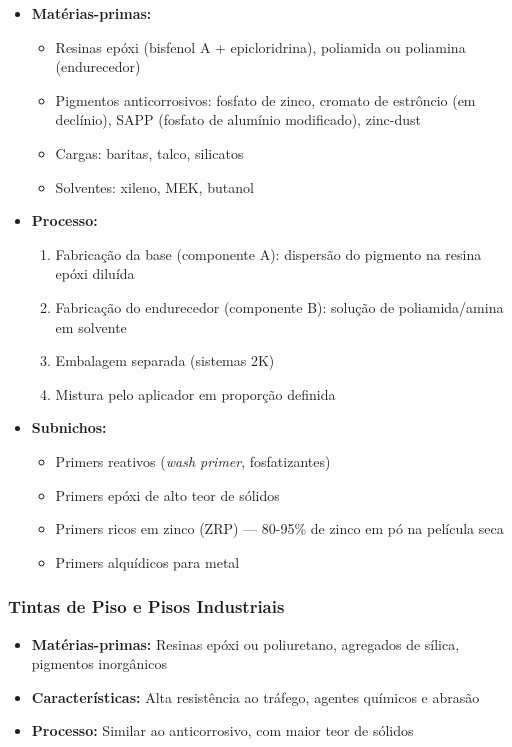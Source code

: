 \documentclass[
  12pt,
  a4paper,
  oneside,
  brazil,
  chapter=TITLE
]{article}
\begin{document}
\begin{itemize}
\tightlist
\item
  \textbf{Matérias-primas:}

  \begin{itemize}
  \tightlist
  \item
    Resinas epóxi (bisfenol A + epicloridrina), poliamida ou poliamina
    (endurecedor)
  \item
    Pigmentos anticorrosivos: fosfato de zinco, cromato de estrôncio (em
    declínio), SAPP (fosfato de alumínio modificado), zinc-dust
  \item
    Cargas: baritas, talco, silicatos
  \item
    Solventes: xileno, MEK, butanol
  \end{itemize}
\item
  \textbf{Processo:}

  \begin{enumerate}
  \def\labelenumi{\arabic{enumi}.}
  \tightlist
  \item
    Fabricação da base (componente A): dispersão do pigmento na resina
    epóxi diluída
  \item
    Fabricação do endurecedor (componente B): solução de poliamida/amina
    em solvente
  \item
    Embalagem separada (sistemas 2K)
  \item
    Mistura pelo aplicador em proporção definida
  \end{enumerate}
\item
  \textbf{Subnichos:}

  \begin{itemize}
  \tightlist
  \item
    Primers reativos (\emph{wash primer}, fosfatizantes)
  \item
    Primers epóxi de alto teor de sólidos
  \item
    Primers ricos em zinco (ZRP) --- 80-95\% de zinco em pó na película
    seca
  \item
    Primers alquídicos para metal
  \end{itemize}
\end{itemize}

\subsubsection{Tintas de Piso e Pisos
Industriais}\label{tintas-de-piso-e-pisos-industriais}

\begin{itemize}
\tightlist
\item
  \textbf{Matérias-primas:} Resinas epóxi ou poliuretano, agregados de
  sílica, pigmentos inorgânicos
\item
  \textbf{Características:} Alta resistência ao tráfego, agentes
  químicos e abrasão
\item
  \textbf{Processo:} Similar ao anticorrosivo, com maior teor de sólidos
\end{itemize}
\end{document}
